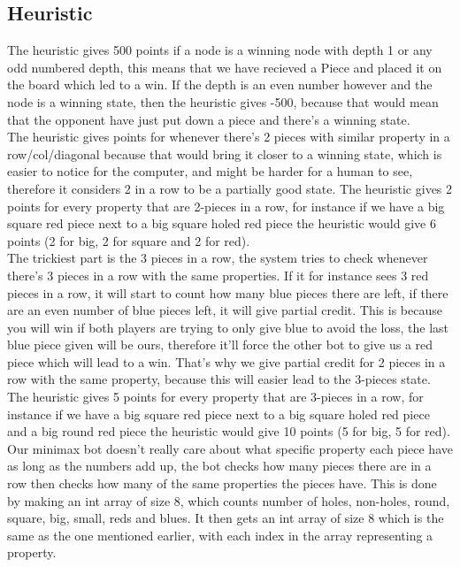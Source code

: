 \documentclass[12pt, a4paper]{article}
\begin{document}
\subsection{Heuristic}
The heuristic gives 500 points if a node is a winning node with depth 1 or any odd numbered depth, this means that we have recieved a Piece and placed it on the board which led to a win. If the depth is an even number however and the node is a winning state, then the heuristic gives -500, because that would mean that the opponent have just put down a piece and there's a winning state. \\
The heuristic gives points for whenever there's 2 pieces with similar property in a row/col/diagonal because that would bring it closer to a winning state, which is easier to notice for the computer, and might be harder for a human to see, therefore it considers 2 in a row to be a partially good state. The heuristic gives 2 points for every property that are 2-pieces in a row, for instance if we have a big square red piece next to a big square holed red piece the heuristic would give 6 points (2 for big, 2 for square and 2 for red).\\
The trickiest part is the 3 pieces in a row, the system tries to check whenever there's 3 pieces in a row with the same properties. If it for instance sees 3 red pieces in a row, it will start to count how many blue pieces there are left, if there are an even number of blue pieces left, it will give partial credit. This is because you will win if both players are trying to only give blue to avoid the loss, the last blue piece given will be ours, therefore it'll force the other bot to give us a red piece which will lead to a win. That's why we give partial credit for 2 pieces in a row with the same property, because this will easier lead to the 3-pieces state. The heuristic gives 5 points for every property that are 3-pieces in a row, for instance if we have a big square red piece next to a big square holed red piece and a big round red piece the heuristic would give 10 points (5 for big, 5 for red).\\
Our minimax bot doesn't really care about what specific property each piece have as long as the numbers add up, the bot checks how many pieces there are in a row then checks how many of the same properties the pieces have. This is done by making an int array of size 8, which counts number of holes, non-holes, round, square, big, small, reds and blues. It then gets an int array of size 8 which is the same as the one mentioned earlier, with each index in the array representing a property.
\end{document}
